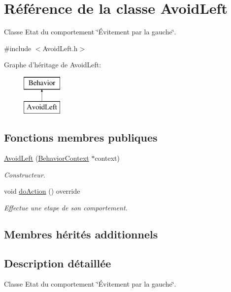 \hypertarget{class_avoid_left}{\section{Référence de la classe Avoid\-Left}
\label{class_avoid_left}
}


Classe Etat du comportement \char`\"{}Évitement par la gauche\char`\"{}.  




{\ttfamily \#include $<$Avoid\-Left.\-h$>$}

Graphe d'héritage de Avoid\-Left\-:\begin{figure}[H]
\begin{center}
\leavevmode
\includegraphics[height=2.000000cm]{class_avoid_left}
\end{center}
\end{figure}
\subsection*{Fonctions membres publiques}
{\bf }\par
\begin{DoxyCompactItemize}
\item 
\hyperlink{class_avoid_left_a0ef7b8c66b6fcfa50b3e80c817e59c18}{Avoid\-Left} (\hyperlink{class_behavior_context}{Behavior\-Context} $\ast$context)
\begin{DoxyCompactList}\small\item\em Constructeur. \end{DoxyCompactList}\item 
void \hyperlink{class_avoid_left_ab2c9b09f40a6e435a54e5c8ace316bfd}{do\-Action} () override
\begin{DoxyCompactList}\small\item\em Effectue une etape de son comportement. \end{DoxyCompactList}\end{DoxyCompactItemize}

\subsection*{Membres hérités additionnels}


\subsection{Description détaillée}
Classe Etat du comportement \char`\"{}Évitement par la gauche\char`\"{}. 

